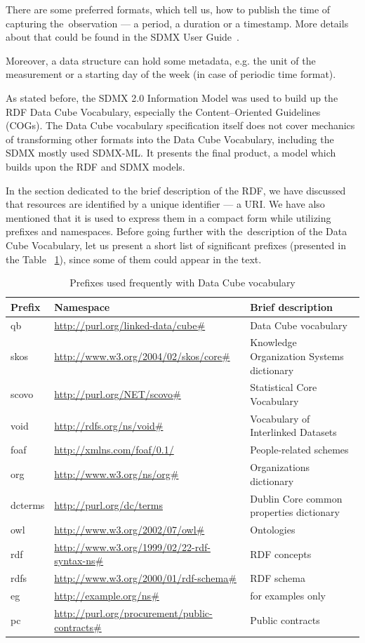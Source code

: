 There are some preferred formats, which tell us, how to publish the time of capturing
the~observation --- a period, a duration or a timestamp. More details about that could be found
in the SDMX User Guide~\cite{sdmxuserguide}.

Moreover, a data structure can hold some metadata, e.g. the unit of the measurement
or a starting day of the week (in case of periodic time format).

As stated before, the SDMX 2.0 Information Model was used to build up the
RDF Data Cube Vocabulary, especially the Content--Oriented Guidelines (COGs). The Data Cube
vocabulary specification itself does not cover mechanics of transforming other formats
into the Data Cube Vocabulary, including the SDMX mostly used SDMX-ML. It presents the final
product, a model which builds upon the RDF and SDMX models.

In the section dedicated to the brief description of the RDF, we have discussed that resources
are identified by a unique identifier --- a URI. We have also mentioned that it is used to express
them in a compact form while utilizing prefixes and namespaces. Before going further with
the~description of the Data Cube Vocabulary, let us present a short list of significant prefixes
(presented in the Table ~\ref{tab:sdmxprefixes}),
since some of them could appear in the text.

\begin{table}[h]\footnotesize
  \caption{Prefixes used frequently with Data Cube vocabulary}
  \label{tab:sdmxprefixes}
\scriptsize\begin{tabular}{l l l}
Prefix & Namespace & Brief description \\
\hline
qb & \url{http://purl.org/linked-data/cube#} & Data Cube vocabulary \\
skos & \url{http://www.w3.org/2004/02/skos/core#} & Knowledge Organization Systems dictionary \\
scovo & \url{http://purl.org/NET/scovo#} & Statistical Core Vocabulary \\
void & \url{http://rdfs.org/ns/void#} & Vocabulary of Interlinked Datasets \\
foaf & \url{http://xmlns.com/foaf/0.1/} & People-related schemes \\
org & \url{http://www.w3.org/ns/org#} & Organizations dictionary \\
dcterms & \url{http://purl.org/dc/terms} & Dublin Core common properties dictionary \\
owl & \url{http://www.w3.org/2002/07/owl#} & Ontologies \\
rdf & \url{http://www.w3.org/1999/02/22-rdf-syntax-ns#} & RDF concepts \\
rdfs & \url{http://www.w3.org/2000/01/rdf-schema#} & RDF schema \\
eg & \url{http://example.org/ns#} & for examples only \\
pc & \url{http://purl.org/procurement/public-contracts#} & Public contracts \\
\end{tabular}\end{table}

